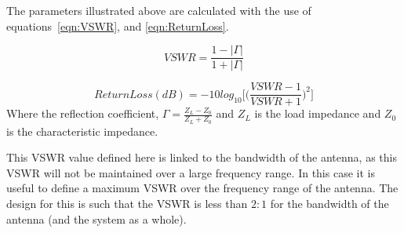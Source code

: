 \documentclass[11pt]{witseiepaper}
\begin{document}
\begin{bibunit}[witseie]
The parameters illustrated above are calculated with the use of equations~\ref{eqn:VSWR}, and \ref{eqn:ReturnLoss}.


\begin{equation} \label{eqn:VSWR}
VSWR = \frac{1 - |\Gamma|}{1 + |\Gamma|}
\end{equation}

\begin{equation} \label{eqn:ReturnLoss}
Return Loss (dB) = -10 log_{10} \Bigg[ \Big(\frac{VSWR - 1}{VSWR + 1} \Big)^2 \Bigg]
\end{equation}
Where the reflection coefficient, $\Gamma = \frac{Z_L - Z_0}{Z_L + Z_0}$ and $Z_L$ is the load impedance and $Z_0$ is the characteristic impedance.

This VSWR value defined here is linked to the bandwidth of the antenna, as this VSWR will not be maintained over a large frequency range. In this case it is useful to define a maximum VSWR over the frequency range of the antenna. The design for this is such that the VSWR is less than $2:1$ for the bandwidth of the antenna (and the system as a whole).


\end{bibunit}
\end{document}
